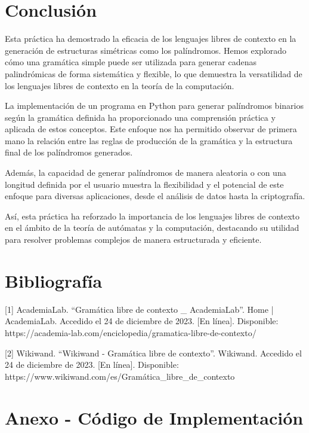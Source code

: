 \documentclass[11pt]{article} %
\begin{document}
	\newpage
	\section*{Conclusión}
	Esta práctica ha demostrado la eficacia de los lenguajes libres de contexto en la generación de estructuras simétricas como los palíndromos. Hemos explorado cómo una gramática simple puede ser utilizada para generar cadenas palindrómicas de forma sistemática y flexible, lo que demuestra la versatilidad de los lenguajes libres de contexto en la teoría de la computación.
	
	La implementación de un programa en Python para generar palíndromos binarios según la gramática definida ha proporcionado una comprensión práctica y aplicada de estos conceptos. Este enfoque nos ha permitido observar de primera mano la relación entre las reglas de producción de la gramática y la estructura final de los palíndromos generados.
	
	Además, la capacidad de generar palíndromos de manera aleatoria o con una longitud definida por el usuario muestra la flexibilidad y el potencial de este enfoque para diversas aplicaciones, desde el análisis de datos hasta la criptografía.
	
	Así, esta práctica ha reforzado la importancia de los lenguajes libres de contexto en el ámbito de la teoría de autómatas y la computación, destacando su utilidad para resolver problemas complejos de manera estructurada y eficiente.
	
	
	\section*{Bibliografía}
	
	
	[1] AcademiaLab. “Gramática libre de contexto \_ AcademiaLab”. Home | AcademiaLab. Accedido el 24 de diciembre de 2023. [En línea]. Disponible: https://academia-lab.com/enciclopedia/gramatica-libre-de-contexto/
	
	
	[2] Wikiwand. “Wikiwand - Gramática libre de contexto”. Wikiwand. Accedido el 24 de diciembre de 2023. [En línea]. Disponible: https://www.wikiwand.com/es/Gramática\_libre\_de\_contexto
	
	
	\newpage
	\section{Anexo - Código de Implementación}
	
\end{document}
